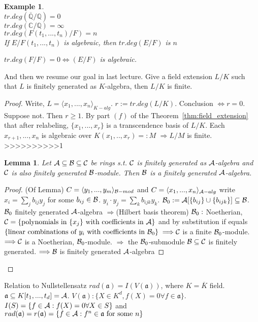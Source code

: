\documentclass[11pt]{article}
\newtheorem{lemma}[thm]{Lemma}
\newtheorem{ex}[thm]{Example}
\newcommand{\cplx}{\mathbb C}
\newcommand{\ratl}{\mathbb Q}
\newcommand{\sca}{{\mathfrak a}}
\newcommand{\cala}{{\cal A}}
\newcommand{\calb}{{\cal B}}
\newcommand{\calc}{{\cal C}}
\newcommand{\Lrta}{\Longrightarrow}
\newcommand{\Llrta}{\Longleftrightarrow}
\newcommand{\lgl}{\langle}
\newcommand{\rgl}{\rangle}
\begin{document}
\begin{ex}\ \\
$tr.deg(\overline{\ratl}/{\ratl})=0$\\
$tr.deg(\cplx/\ratl)=\infty$\\
$tr.deg(F(t_1,...,t_n)/F)=n$\\
If $E/F(t_1,...,t_n)$ is algebraic, then $tr.deg(E/F)$ is $n$

$tr.deg(F/F)=0\Llrta (E/F)$ is algebraic.
\end{ex}

And then we resume our goal in last lecture. Give a field extension $L/K$ such that $L$ is finitely generated as $K$-algebra, then $L/K$ is finite.
\begin{proof}
Write, $L=\lgl x_1,...,x_n\rgl_{K-alg}$.
$r:=tr.deg(L/K). $ Conclusion $\Llrta r=0$. Suppose not. Then $r\geq 1$. By part $(f)$ of the Theorem~\ref{thm:field_extension} that after relabeling,
$\{x_1,...,x_r\}$ is a transcendence basis of $L/K$. Each $x_{r+1},...,x_n$ is algebraic over $K(x_1,..,x_r)=:M$ $\Lrta L/M$ is finite.
>>>>>>>>>>1
\begin{lemma}
Let $\cala\subseteq\calb\subseteq\calc$ be rings s.t. $\calc$ is finitely generated as $\cala$-algebra and $\calc$ is also finitely generated $\calb$-module. Then $\calb$ is a finitely generated $\cala$-algebra.
\end{lemma}
\begin{proof}
(Of Lemma) $C=\lgl y_1,...,y_m\rgl_{\calb-mod}$ and $C=\lgl x_1,...,x_n\rgl_{\cala-alg}$ write $x_i=\sum_j b_{ij} y_j$ for some $b_{ij}\in \calb$. $y_i\cdot y_j=\sum_k b_{ijk}y_k$. $\calb_0:=\cala[\{b_{ij}\}\cup \{b_{ijk}\}]\subseteq \calb$. $\calb_0$ finitely generated $\cala$-algebra $\Lrta $(Hilbert basis theorem) $\calb_0:$ Noetherian, $\calc=\{\text{polynomials in }\{x_{j}\}\text{ with coefficients in }\cala\}$ and by substitution if equals $\{\text{linear combinations of $y_i$ with coefficients in $\calb_0$}\}$ $\Lrta \calc$ is a finite $\calb_0$-module. $\Lrta \calc$ is a Noetherian, $\calb_0$-module. $\Lrta$ the $\calb_0$-submodule $\calb\subseteq \calc$ is finitely generated. $\Lrta\calb$ is finitely generated $\cala$-algebra
\end{proof}
\end{proof}

Relation to Nullstellensatz $rad(\sca)=I(V(\sca))$, where $K=\overline{K}$ field. $\sca\subseteq K[t_1,...,t_d]=\cala$. $V(\sca):\{X\in K^d, f(X)=0\forall f\in \sca\}$. $I(S)=\{f\in \cala:f(X)=0\forall X\in S\}$ and $rad(\sca)=r(\sca)=\{f\in \cala:f^n\in \sca \text{ for some } n\}$
\end{document}
